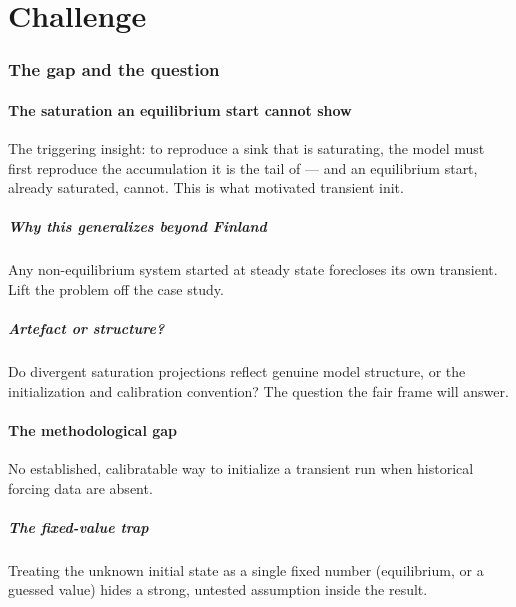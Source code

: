 \documentclass[11pt]{article}
\begin{document}
\part{Challenge}

\section{The gap and the question}

\subsection{The saturation an equilibrium start cannot show}
The triggering insight: to reproduce a sink that is saturating, the model must
first reproduce the accumulation it is the tail of --- and an equilibrium
start, already saturated, cannot. This is what motivated transient init.

\subsubsection{Why this generalizes beyond Finland}
Any non-equilibrium system started at steady state forecloses its own
transient. Lift the problem off the case study.

\subsubsection{Artefact or structure?}
Do divergent saturation projections reflect genuine model structure, or the
initialization and calibration convention? The question the fair frame will
answer.

\subsection{The methodological gap}
No established, calibratable way to initialize a transient run when
historical forcing data are absent.

\subsubsection{The fixed-value trap}
Treating the unknown initial state as a single fixed number (equilibrium, or a
guessed value) hides a strong, untested assumption inside the result.
\end{document}
